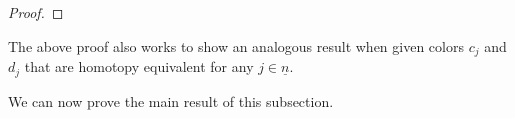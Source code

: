 \documentclass[a4paper,10pt
]{article}%
\renewcommand{\F}{\mathcal F}
\renewcommand{\1}{\ensuremath{\mathbb{id}}}
\begin{document}
\begin{proof}
\end{proof}

\begin{remark}
      \label{CAV_4.14_REM}
      The above proof also works to show an analogous result when given colors $c_j$ and $d_j$ that are homotopy equivalent
      for any $j \in \underline{n}$. 
\end{remark}

We can now prove the main result of this subsection.
 
\end{document}

